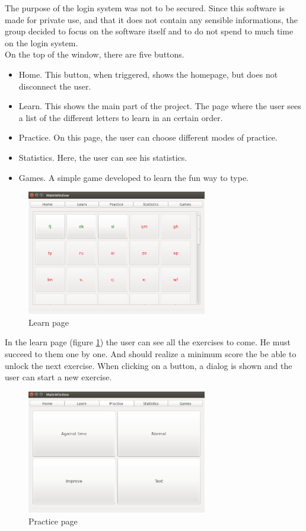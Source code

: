 The purpose of the login system was not to be secured. Since this software is made for private use, and that it does not contain any sensible informations, the group decided to focus on the software itself and to do not spend to much time on the login system. \\
On the top of the window, there are five buttons.
\begin{itemize}
	\item Home. This button, when triggered, shows the homepage, but does not disconnect the user.
	\item Learn. This shows the main part of the project. The page where the user sees a list of the different letters to learn in an certain order.
	\item Practice. On this page, the user can choose different modes of practice.
	\item Statistics. Here, the user can see his statistics.
	\item Games. A simple game developed to learn the fun way to type.
\end{itemize}


\begin{figure}[H]
	\centering
	\includegraphics[width=0.7\textwidth]{images/page-learn.png}
	\caption{Learn page}
	\label{page-learn}
\end{figure}

In the learn page (figure \ref{page-learn}) the user can see all the exercises to come. He must succeed to them one by one. And should realize a minimum score the be able to unlock the next exercise. When clicking on a button, a dialog is shown and the user can start a new exercise.

\begin{figure}[H]
	\centering
	\includegraphics[width=0.7\textwidth]{images/page-practice.png}
	 \caption{Practice page}
	 \label{page-practice}
\end{figure}

